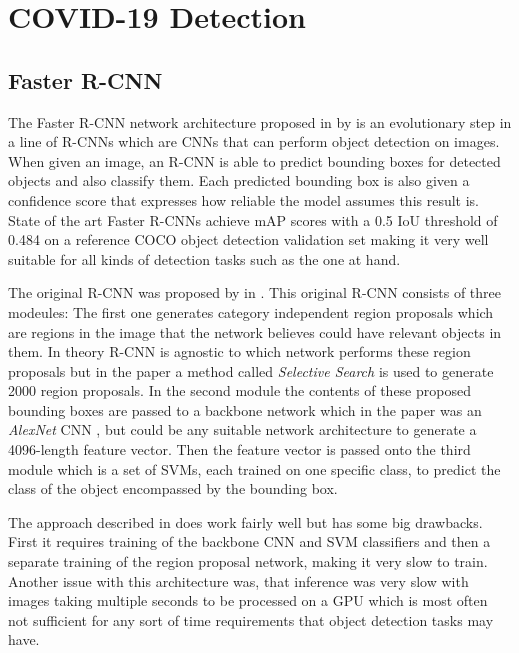 \chapter{COVID-19 Detection}\label{chapter:detection}


\section{Faster R-CNN}\label{chapter:rcnn}

The Faster \acf{R-CNN} network architecture proposed in \autocite{ren_faster_2016} by \citeauthor{ren_faster_2016} is an evolutionary step in a line of \acp{R-CNN} which are \acp{CNN} that can perform object detection on images. When given an image, an \ac{R-CNN} is able to predict bounding boxes for detected objects and also classify them. Each predicted bounding box is also given a confidence score that expresses how reliable the model assumes this result is. State of the art Faster \acp{R-CNN} achieve \ac{mAP} scores with a \num{0.5} \ac{IoU} threshold of \num{0.484} on a reference COCO object detection validation set making it very well suitable for all kinds of detection tasks such as the one at hand. 

The original \ac{R-CNN} was proposed by \citeauthor{girshick_rich_2014} in \autocite{girshick_rich_2014}. This original \ac{R-CNN} consists of three modeules: The first one generates category independent region proposals which are regions in the image that the network believes could have relevant objects in them. In theory \ac{R-CNN} is agnostic to which network performs these region proposals but in the paper a method called \textit{Selective Search} \autocite{uijlings_selective_2013} is used to generate \num{2000} region proposals. In the second module the contents of these proposed bounding boxes are passed to a backbone network which in the paper was an \textit{AlexNet} CNN \autocite{krizhevsky_imagenet_2017}, but could be any suitable network architecture to generate a 4096-length feature vector. Then the feature vector is passed onto the third module which is a set of \acp{SVM}, each trained on one specific class, to predict the class of the object encompassed by the bounding box.

The approach described in \autocite{girshick_rich_2014} does work fairly well but has some big drawbacks. First it requires training of the backbone CNN and \ac{SVM} classifiers and then a separate training of the region proposal network, making it very slow to train. Another issue with this architecture was, that inference was very slow with images taking multiple seconds to be processed on a GPU which is most often not sufficient for any sort of time requirements that object detection tasks may have.

